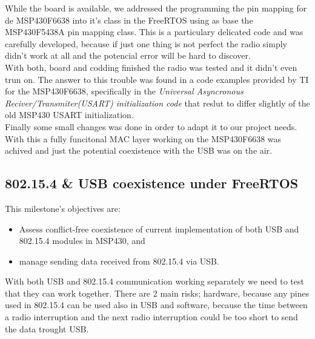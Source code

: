		While the board is available, we addressed the programming the pin mapping for de MSP430F6638 into it's class in the FreeRTOS using as base the MSP430F5438A pin mapping class. This is a particulary delicated code and was carefully developed, because if just one thing is not perfect the radio simply didn't work at all and the potencial error will be hard to discover. \\

		With both, board and codding finished the radio was tested and it didn't even trun on. The answer to this trouble was found in a code examples provided by TI for the MSP430F6638, specifically in the \textit{Universal Asyncronous Reciver/Transmiter(USART) initialization code} that reslut to differ slightly of the old MSP430 USART initialization.\\

		Finally some small changes was done in order to adapt it to our project needs. With this a fully funcitonal MAC layer working on the MSP430F6638 was achived and just the potential coexistence with the USB was on the air.\\


		\subsection{802.15.4 \& USB coexistence under FreeRTOS}
		This milestone's objectives are:
		\begin{itemize}
		\item Assess conflict-free coexistence of current implementation of both USB and 802.15.4 modules in MSP430, and
		\item manage sending data received from 802.15.4 via USB.
		\end{itemize}
		With both USB and 802.15.4 communication working separately we need to test that they can work together. There are 2 main risks; hardware, because any pines used in 802.15.4 can be used also in USB and software, because the time between a radio interruption and the next radio interruption could be too short to send the data trought USB.\\

